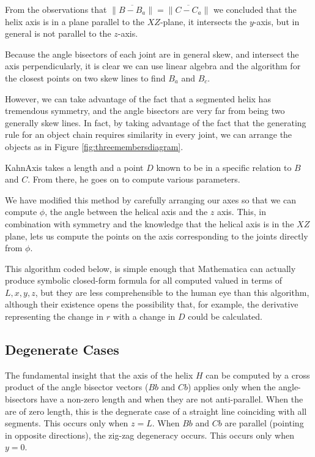 \documentclass[11pt]{article}
\begin{document}
{From the observations that $\| \overline{B - B_a} \| = \| \overline{C - C_a} \|$
we concluded that the helix axis is in a plane
parallel to the $XZ$-plane, it intersects the $y$-axis, but in general is
not parallel to the $z$-axis.

Because the angle bisectors of each joint are in general skew, and intersect the
axis perpendicularly, it is clear we can use linear algebra and the algorithm
for the closest points on two skew lines to find $B_a$ and $B_c$.

However, we can take advantage of the fact that a segmented helix has
tremendous symmetry, and the angle bisectors are very far from being two
generally skew lines. In fact, by taking advantage of the fact that the
generating rule for an object chain requires similarity in every joint,
we can arrange the objects as in Figure \ref{fig:threemembersdiagram}.

KahnAxis takes a length and a point $D$ known to be in
a specific relation to $B$ and $C$.
From there, he goes on to compute various parameters.

We have modified this method by carefully arranging our axes
so that we can compute $\phi$, the angle between the helical axis
and the $z$ axis. This, in combination with symmetry and the knowledge
that the helical axis is in the $XZ$ plane, lets us compute the
points on the axis corresponding to the joints directly from $\phi$.

This algorithm coded below, is simple enough that Mathematica can
actually produce symbolic closed-form formula for all computed valued
in terms of $L, x, y, z$, but they are less comprehensible to the
human eye than this algorithm, although their existence opens
the possibility that, for example, the derivative representing
the change in $r$ with a change in $D$ could be calculated.

\subsection{Degenerate Cases}

The fundamental insight that the axis of the helix $H$ can be
computed by a cross product of the angle bisector
vectors ($Bb$ and $Cb$) applies only
when the angle-bisectors have a non-zero length and when
they are not anti-parallel. When the are of zero length, this is
the degnerate case of a straight line coinciding with all segments.
This occurs only when $z = L$.
When $Bb$ and $Cb$ are parallel (pointing in opposite directions),
the zig-zag degeneracy occurs. This occurs only when $y = 0$.

}
\end{document}

